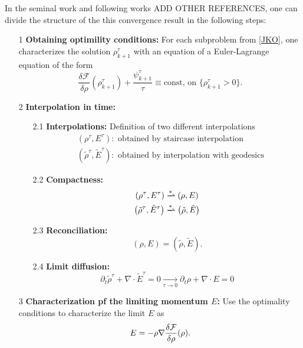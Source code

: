 In the seminal work \cite{jordan1998variational} and following works {\color{blue} ADD OTHER REFERENCES}, one can divide the structure of the this convergence result in the following steps:
\begin{enumerate}
	\item[1] {\bf \color{red} Obtaining optimility conditions:} For each subproblem from \eqref{JKO}, one characterizes the solution $\rho^{\tau}_{k+1}$ with an equation of a Euler-Lagrange equation of the form
	\begin{equation*}
		\frac{\delta \mathcal{F}}{\delta \rho}(\rho^{\tau}_{k+1}) + \frac{\psi^{\tau}_{k+1}}{\tau} \equiv \text{const, on $\{\rho^{\tau}_{k+1} > 0\}$}. 
	\end{equation*}
	\item[2] {\bf \color{blue} Interpolation in time:}
		\begin{enumerate}
			\item [2.1] {\bf \color{blue} Interpolations:} Definition of two different interpolations
			\begin{align*}
				&\left(\rho^{\tau}, E^{\tau}\right): \text{ obtained by staircase interpolation}\\
				&\left(\tilde\rho^{\tau}, \tilde E^{\tau}\right): \text{ obtained by interpolation with geodesics}
			\end{align*}
			\item[2.2] {\bf \color{blue} Compactness:}
				\begin{align*}
					\left(\rho^{\tau}, E^{\tau}\right) &\xrightharpoonup{*} \left(\rho, E\right)\\
					\left(\tilde\rho^{\tau}, \tilde E^{\tau}\right) &\xrightharpoonup{*} \left(\tilde\rho, \tilde E\right)
				\end{align*}
			\item[2.3] {\bf \color{blue} Reconciliation:}
			$$
			(\rho, E) = (\tilde \rho, \tilde E). 
			$$
			\item[2.4] {\bf \color{blue} Limit diffusion:}
			$$
				\partial_t \tilde \rho^{\tau} + \nabla \cdot \tilde E^{\tau} = 0 \xrightarrow[\tau \to 0]{} \partial_t \rho + \nabla \cdot E = 0
			$$
		\end{enumerate}
	\item[3] {\bf \color{red} Characterization pf the limiting momentum $E$:} Use the optimality conditions to characterize the limit $E$ as 
	\begin{equation*}
		E = - \rho \nabla \frac{\delta \mathcal{F}}{\delta \rho}(\rho). 
	\end{equation*}
\end{enumerate}

